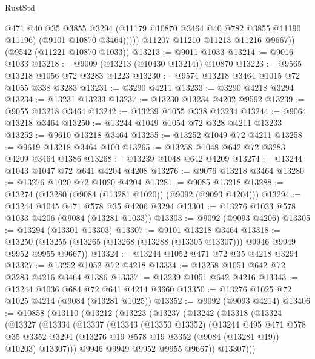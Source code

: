 \begin{lexlean}{RustStd}
\begin{coremodule}
                @471
                @40
                @35
                @3855
                @3294
                (@11179 @10870 @3464 @40 @782 @3855 @11190 @11196)
                (@9101 @10870 @3464)))))
        @11207
        @11210
        @11213
        @11216
        @9667))
    (@9542 (@11221 @10870 @1033))
@13213 := @9011 @1033
@13214 := @9016 @1033
@13218 := @9009 (@13213 (@10430 @13214)) @10870
@13223 := @9565 @13218 @1056 @72 @3283 @4223
@13230 := @9574 @13218 @3464 @1015 @72 @1055 @338 @3283
@13231 := @3290 @4211
@13233 := @3290 @4218 @3294
@13234 := @13231 @13233
@13237 := @13230 @13234 @4202 @9592
@13239 := @9055 @13218 @3464
@13242 := @13239 @1055 @338 @13234
@13244 := @9064 @13218 @3464
@13250 := @13244 @1049 @1054 @72 @328 @4211 @13233
@13252 := @9610 @13218 @3464
@13255 := @13252 @1049 @72 @4211
@13258 := @9619 @13218 @3464 @100
@13265 := @13258 @1048 @642 @72 @3283 @4209 @3464 @1386
@13268 := @13239 @1048 @642 @4209
@13274 := @13244 @1043 @1047 @72 @641 @4204 @4208
@13276 := @9076 @13218 @3464
@13280 := @13276 @1020 @72 @1020 @4204
@13281 := @9085 @13218
@13288 := @13274 (@13280 (@9084 (@13281 @1020)) (@9092 (@9093 @4204)))
@13294 := @13244 @1045 @471 @578 @35 @4206 @3294
@13301 := @13276 @1033 @578 @1033 @4206 (@9084 (@13281 @1033))
@13303 := @9092 (@9093 @4206)
@13305 := @13294 (@13301 @13303)
@13307 := @9101 @13218 @3464
@13318 := @13250 (@13255 (@13265 (@13268 (@13288 (@13305 @13307))) @9946 @9949 @9952 @9955 @9667))
@13324 := @13244 @1052 @471 @72 @35 @4218 @3294
@13327 := @13252 @1052 @72 @4218
@13334 := @13258 @1051 @642 @72 @3283 @4216 @3464 @1386
@13337 := @13239 @1051 @642 @4216
@13343 := @13244 @1036 @684 @72 @641 @4214 @3660
@13350 := @13276 @1025 @72 @1025 @4214 (@9084 (@13281 @1025))
@13352 := @9092 (@9093 @4214)
@13406 := @10858
    (@13110
      (@13212
        (@13223
          (@13237
            (@13242
              (@13318
                (@13324
                  (@13327
                    (@13334
                      (@13337
                        (@13343
                          (@13350 @13352)
                          (@13244
                            @495
                            @471
                            @578
                            @35
                            @3352
                            @3294
                            (@13276 @19 @578 @19 @3352 (@9084 (@13281 @19)) @10203)
                            @13307)))
                      @9946
                      @9949
                      @9952
                      @9955
                      @9667))
                  @13307)))

\end{coremodule}
\end{lexlean}
